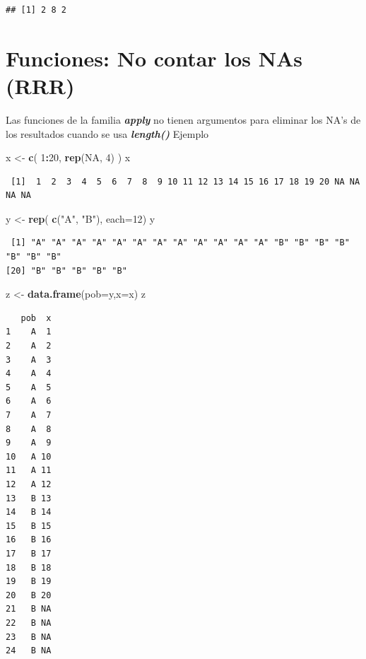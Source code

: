 \documentclass[]{book}
\newenvironment{Shaded}{\begin{snugshade}}{\end{snugshade}}
\newcommand{\DataTypeTok}[1]{\textcolor[rgb]{0.13,0.29,0.53}{#1}}
\newcommand{\DecValTok}[1]{\textcolor[rgb]{0.00,0.00,0.81}{#1}}
\newcommand{\KeywordTok}[1]{\textcolor[rgb]{0.13,0.29,0.53}{\textbf{#1}}}
\newcommand{\NormalTok}[1]{#1}
\newcommand{\OperatorTok}[1]{\textcolor[rgb]{0.81,0.36,0.00}{\textbf{#1}}}
\newcommand{\OtherTok}[1]{\textcolor[rgb]{0.56,0.35,0.01}{#1}}
\newcommand{\StringTok}[1]{\textcolor[rgb]{0.31,0.60,0.02}{#1}}
\begin{document}
\begin{verbatim}
## [1] 2 8 2
\end{verbatim}

\hypertarget{funciones-no-contar-los-nas-rrr}{%
\section{Funciones: No contar los NAs (RRR)}\label{funciones-no-contar-los-nas-rrr}}

Las funciones de la familia \textbf{\emph{apply}} no tienen argumentos para eliminar los NA's de los resultados cuando se usa \textbf{\emph{length()}}
Ejemplo

\begin{Shaded}
\begin{Highlighting}[]
\NormalTok{    x <-}\StringTok{ }\KeywordTok{c}\NormalTok{( }\DecValTok{1}\OperatorTok{:}\DecValTok{20}\NormalTok{, }\KeywordTok{rep}\NormalTok{(}\OtherTok{NA}\NormalTok{, }\DecValTok{4}\NormalTok{) )}
\NormalTok{    x}
\end{Highlighting}
\end{Shaded}

\begin{verbatim}
 [1]  1  2  3  4  5  6  7  8  9 10 11 12 13 14 15 16 17 18 19 20 NA NA NA NA
\end{verbatim}

\begin{Shaded}
\begin{Highlighting}[]
\NormalTok{        y <-}\StringTok{ }\KeywordTok{rep}\NormalTok{( }\KeywordTok{c}\NormalTok{(}\StringTok{"A"}\NormalTok{, }\StringTok{"B"}\NormalTok{), }\DataTypeTok{each=}\DecValTok{12}\NormalTok{) }
\NormalTok{    y}
\end{Highlighting}
\end{Shaded}

\begin{verbatim}
 [1] "A" "A" "A" "A" "A" "A" "A" "A" "A" "A" "A" "A" "B" "B" "B" "B" "B" "B" "B"
[20] "B" "B" "B" "B" "B"
\end{verbatim}

\begin{Shaded}
\begin{Highlighting}[]
\NormalTok{        z <-}\StringTok{ }\KeywordTok{data.frame}\NormalTok{(}\DataTypeTok{pob=}\NormalTok{y,}\DataTypeTok{x=}\NormalTok{x)}
\NormalTok{    z}
\end{Highlighting}
\end{Shaded}

\begin{verbatim}
   pob  x
1    A  1
2    A  2
3    A  3
4    A  4
5    A  5
6    A  6
7    A  7
8    A  8
9    A  9
10   A 10
11   A 11
12   A 12
13   B 13
14   B 14
15   B 15
16   B 16
17   B 17
18   B 18
19   B 19
20   B 20
21   B NA
22   B NA
23   B NA
24   B NA
\end{verbatim}
\end{document}
